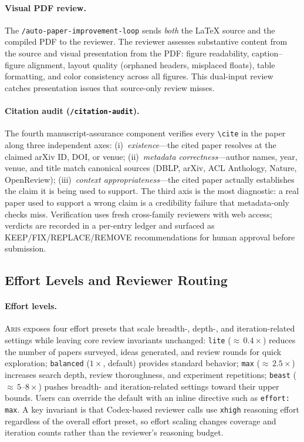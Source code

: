 \documentclass{article}
\newcommand{\aris}{\textsc{Aris}}
\theoremstyle{remark}
\begin{document}
\paragraph{Visual PDF review.}
The \texttt{/auto-paper-improvement-loop} sends \emph{both} the \LaTeX{} source and the compiled PDF to the reviewer.
The reviewer assesses substantive content from the source and visual presentation from the PDF: figure readability, caption--figure alignment, layout quality (orphaned headers, misplaced floats), table formatting, and color consistency across all figures.
This dual-input review catches presentation issues that source-only review misses.

\paragraph{Citation audit (\texttt{/citation-audit}).}
The fourth manuscript-assurance component verifies every \texttt{\textbackslash cite} in the paper along three independent axes:
(i)~\emph{existence}---the cited paper resolves at the claimed arXiv ID, DOI, or venue;
(ii)~\emph{metadata correctness}---author names, year, venue, and title match canonical sources (DBLP, arXiv, ACL Anthology, Nature, OpenReview);
(iii)~\emph{context appropriateness}---the cited paper actually establishes the claim it is being used to support.
The third axis is the most diagnostic: a real paper used to support a wrong claim is a credibility failure that metadata-only checks miss.
Verification uses fresh cross-family reviewers with web access; verdicts are recorded in a per-entry ledger and surfaced as KEEP/FIX/REPLACE/REMOVE recommendations for human approval before submission.

\subsection{Effort Levels and Reviewer Routing}
\label{sec:effort}

\paragraph{Effort levels.}
\aris{} exposes four effort presets that scale breadth-, depth-, and iteration-related settings while leaving core review invariants unchanged:
\texttt{lite} (${\approx}\,0.4\times$) reduces the number of papers surveyed, ideas generated, and review rounds for quick exploration;
\texttt{balanced} ($1\times$, default) provides standard behavior;
\texttt{max} (${\approx}\,2.5\times$) increases search depth, review thoroughness, and experiment repetitions;
\texttt{beast} (${\approx}\,5$--$8\times$) pushes breadth- and iteration-related settings toward their upper bounds.
Users can override the default with an inline directive such as \texttt{effort: max}.
A key invariant is that Codex-based reviewer calls use \texttt{xhigh} reasoning effort regardless of the overall effort preset, so effort scaling changes coverage and iteration counts rather than the reviewer's reasoning budget.
\end{document}
